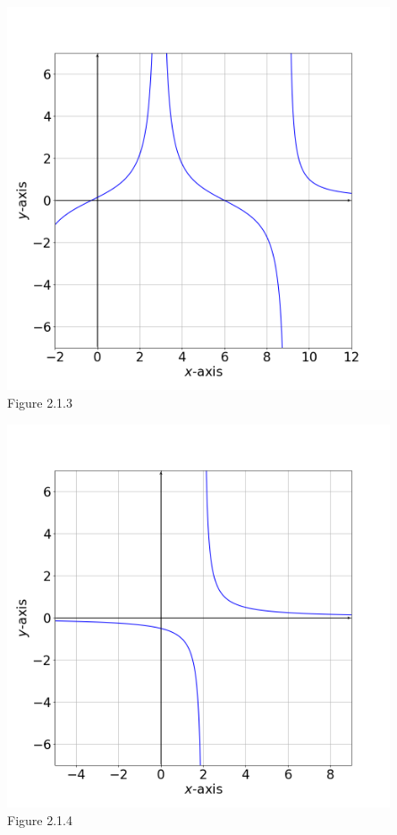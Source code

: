 \documentclass[11pt]{book}
\theoremstyle{break}
\theoremstyle{no_label}
\newcommand{\figtag}[1]{\\[-1.2em]Figure {#1}}
\numberwithin{equation}{section}
\begin{document}
\begin{center}
    \begin{minipage}{0.485\textwidth}
        \begin{center}
            \includegraphics[width=0.85\textwidth]{critical.png}\figtag{2.1.3}
        \end{center}
    \end{minipage}
    \begin{minipage}{0.485\textwidth}
        \begin{center}
            \includegraphics[width=0.85\textwidth]{limit_reciprocal.png}\figtag{2.1.4}
        \end{center}
    \end{minipage}
\end{center}
\end{document}
